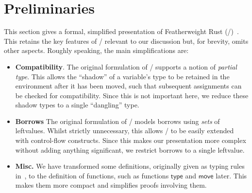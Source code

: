 \section{Preliminaries}\label{sec:featherweight}

This section gives a formal, simplified presentation of Featherweight
Rust (\FR/)~\cite{Pea21}.  This retains the key features of \FR/
relevant to our discussion but, for brevity, omits other aspects.
Roughly speaking, the main simplifications are:
%
\begin{itemize}

\item {\bf Compatibility}.  The original formulation of \FR/ supports
  a notion of {\em partial type}.  This allows the ``shadow'' of a
  variable's type to be retained in the environment after it has been
  moved, such that subsequent assignments can be checked for
  compatibility.  Since this is not important here, we reduce these
  shadow types to a single ``dangling'' type.
  
\item {\bf Borrows} The original formulation of \FR/ models borrows
  using {\em sets} of leftvalues.  Whilst strictly unnecessary, this
  allows \FR/ to be easily extended with control-flow constructs.
  Since this makes our presentation more complex without adding
  anything significant, we restrict borrows to a single leftvalue.

\item {\bf Misc.} We have transformed some definitions, originally
  given as typing rules in~\cite{Pea21}, to the definition of
  functions, such as functions $\mathsf{type}$ and $\mathsf{move}$
  later.  This makes them more compact and simplifies proofs involving
  them.
\end{itemize}

